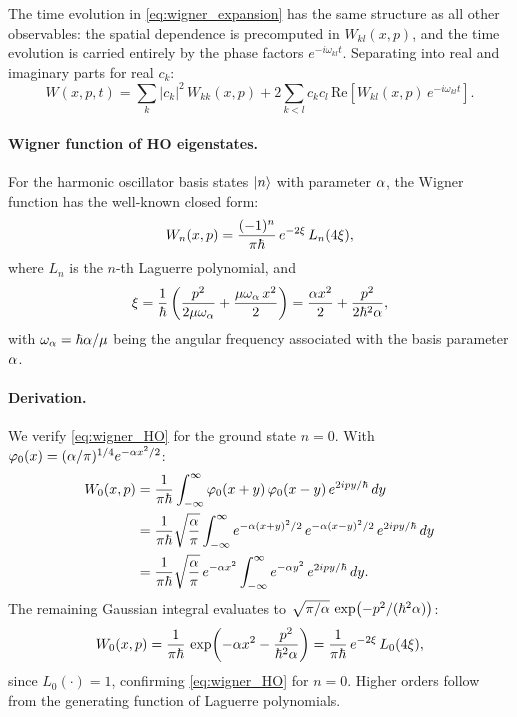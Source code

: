 The time evolution in \cref{eq:wigner_expansion} has the same structure as all other observables: the spatial dependence is precomputed in $W_{kl}(x,p)$, and the time evolution is carried entirely by the phase factors $e^{-i\omega_{kl}t}$.
Separating into real and imaginary parts for real $c_k$:
\begin{equation}\label{eq:wigner_time}
  W(x,p,t) = \sum_k |c_k|^2\,W_{kk}(x,p)
  + 2\sum_{k<l} c_k c_l\,\text{Re}\!\left[W_{kl}(x,p)\,e^{-i\omega_{kl}t}\right].
\end{equation}

\paragraph{Wigner function of HO eigenstates.}

For the harmonic oscillator basis states $\ket{n}$ with parameter $\alpha$, the Wigner function has the well-known closed form:
\begin{equation}\label{eq:wigner_HO}
  W_n(x,p) = \frac{(-1)^n}{\pi\hbar}\,e^{-2\xi}\,L_n(4\xi),
\end{equation}
where $L_n$ is the $n$-th Laguerre polynomial, and
\begin{equation}\label{eq:xi_def}
  \xi = \frac{1}{\hbar}\left(\frac{p^2}{2\mu\omega_\alpha} + \frac{\mu\omega_\alpha\,x^2}{2}\right)
  = \frac{\alpha x^2}{2} + \frac{p^2}{2\hbar^2\alpha},
\end{equation}
with $\omega_\alpha = \hbar\alpha/\mu$ being the angular frequency associated with the basis parameter $\alpha$.

\paragraph{Derivation.}

We verify \cref{eq:wigner_HO} for the ground state $n = 0$.
With $\varphi_0(x) = (\alpha/\pi)^{1/4}e^{-\alpha x^2/2}$:
\begin{align}
  W_0(x,p) &= \frac{1}{\pi\hbar}\int_{-\infty}^{\infty} \varphi_0(x+y)\,\varphi_0(x-y)\,e^{2ipy/\hbar}\,dy\notag\\
  &= \frac{1}{\pi\hbar}\sqrt{\frac{\alpha}{\pi}}\int_{-\infty}^{\infty} e^{-\alpha(x+y)^2/2}\,e^{-\alpha(x-y)^2/2}\,e^{2ipy/\hbar}\,dy\notag\\
  &= \frac{1}{\pi\hbar}\sqrt{\frac{\alpha}{\pi}}\,e^{-\alpha x^2}\int_{-\infty}^{\infty} e^{-\alpha y^2}\,e^{2ipy/\hbar}\,dy.
\end{align}
The remaining Gaussian integral evaluates to $\sqrt{\pi/\alpha}\,\exp(-p^2/(\hbar^2\alpha))$:
\begin{equation}
  W_0(x,p) = \frac{1}{\pi\hbar}\,\exp\!\left(-\alpha x^2 - \frac{p^2}{\hbar^2\alpha}\right)
  = \frac{1}{\pi\hbar}\,e^{-2\xi}\,L_0(4\xi),
\end{equation}
since $L_0(\cdot) = 1$, confirming \cref{eq:wigner_HO} for $n = 0$.
Higher orders follow from the generating function of Laguerre polynomials.

